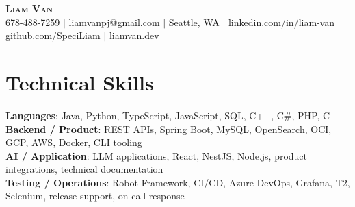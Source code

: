 \documentclass[letterpaper,11pt]{article}
\begin{document}

%
\begin{center}
    \textbf{\Huge \scshape Liam Van} \\ \vspace{1pt}
    \small 678-488-7259 $|$ \small {liamvanpj@gmail.com} $|$ Seattle, WA
 {{$|$ linkedin.com/in/liam-van} {$|$ github.com/SpeciLiam} {$|$ \href{https://liamvan.dev}{liamvan.dev}}}

\end{center}

\section{Technical Skills}
 \begin{itemize}[leftmargin=0.15in, label={}]
    \small{\item{
     \textbf{Languages}{: Java, Python, TypeScript, JavaScript, SQL, C++, C\#, PHP, C} \\
     \textbf{Backend / Product}{: REST APIs, Spring Boot, MySQL, OpenSearch, OCI, GCP, AWS, Docker, CLI tooling} \\
     \textbf{AI / Application}{: LLM applications, React, NestJS, Node.js, product integrations, technical documentation} \\
     \textbf{Testing / Operations}{: Robot Framework, CI/CD, Azure DevOps, Grafana, T2, Selenium, release support, on-call response} \\
    }}
 \end{itemize}
%

\end{document}
